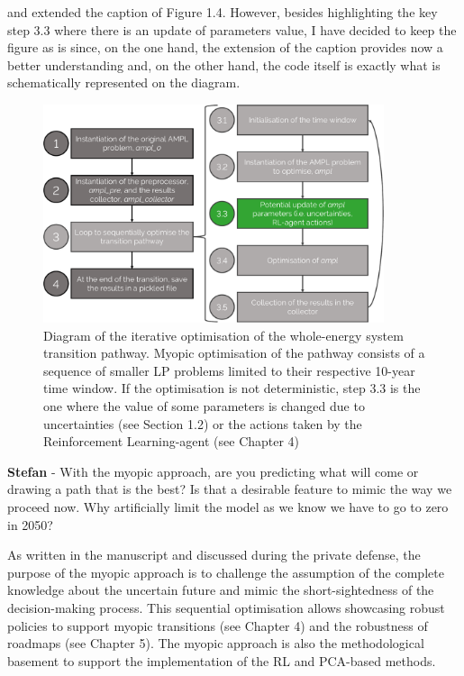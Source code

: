 \documentclass[12pt,a4paper]{article}
\begin{document}
\noindent and extended the caption of {\color{blue} Figure 1.4}. However, besides highlighting the key step 3.3 where there is an update of parameters value, I have decided to keep the figure as is since, on the one hand, the extension of the caption provides now a better understanding and, on the other hand, the code itself is exactly what is schematically represented on the diagram. 

\begin{figure}[htbp!]
\centering
\includegraphics[width=10cm]{MY_process_code.pdf}
\caption{Diagram of the iterative optimisation of the whole-energy system transition pathway. Myopic optimisation of the pathway consists of a sequence of smaller LP problems limited to their respective 10-year time window. If the optimisation is not deterministic, step 3.3 is the one where the value of some parameters is changed due to uncertainties (see Section 1.2) or the actions taken by the Reinforcement Learning-agent (see Chapter 4)}
\label{fig:MY_process_code}
\end{figure}

\begin{mdframed}[style=comment] %
{\color{teal} \textbf{Stefan}} - With the myopic approach, are you predicting what will come or drawing a path that is the best? Is that a desirable feature to mimic the way we proceed now. Why artificially limit the model as we know we have to go to zero in 2050?
\end{mdframed}

\noindent As written in the manuscript and discussed during the private defense, the purpose of the myopic approach is to challenge the assumption of the complete knowledge about the uncertain future and mimic the short-sightedness of the decision-making process. This sequential optimisation allows showcasing robust policies to support myopic transitions (see Chapter 4) and the robustness of roadmaps (see Chapter 5). The myopic approach is also the methodological basement to support the implementation of the RL and PCA-based methods. 
\end{document}
